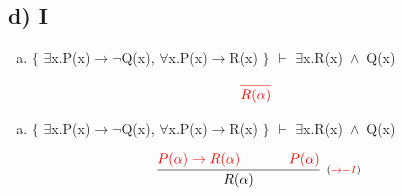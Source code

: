 \documentclass[aspectratio=43]{beamer}
\newcommand{\ria}{$\rightarrow$}
\newcommand{\fall}{$\forall$}
\newcommand{\ex}{$\exists$}
\newcommand{\nao}{$\neg$}
\newcommand{\andd}{$\wedge$}
\begin{document}
    \subsection{d) I}
    
    \begin{frame}[fragile]
    
    	\begin{enumerate}[d)]
			\item $\{$ \ex x.P(x)\ria \nao Q(x), \fall x.P(x)\ria R(x) $\}$ $\vdash$ \ex x.R(x)\ \andd\ Q(x) \\
		\end{enumerate}
        
        \vspace{80pt}
        
        \[
        \begin{array}{c}
		
        	\textcolor{red}{
            \infer[_{}]
            	{R(\alpha)}
            	{}
        	}
		\end{array}
        \]
        
	\end{frame}
    
    \begin{frame}[fragile]
    
    	\begin{enumerate}[d)]
			\item $\{$ \ex x.P(x)\ria \nao Q(x), \fall x.P(x)\ria R(x) $\}$ $\vdash$ \ex x.R(x)\ \andd\ Q(x) \\
		\end{enumerate}
        
        \vspace{75pt}
        
        \[
        \begin{array}{c}
		
        	\infer[_{(\textcolor{red}{\to -I})}]
            	{R(\alpha)}
            	{\textcolor{red}{P(\alpha) \rightarrow R(\alpha)} \hspace{35pt} \textcolor{red}{P(\alpha)}}
		\end{array}
        \]
        
	\end{frame}
    
\end{document}
